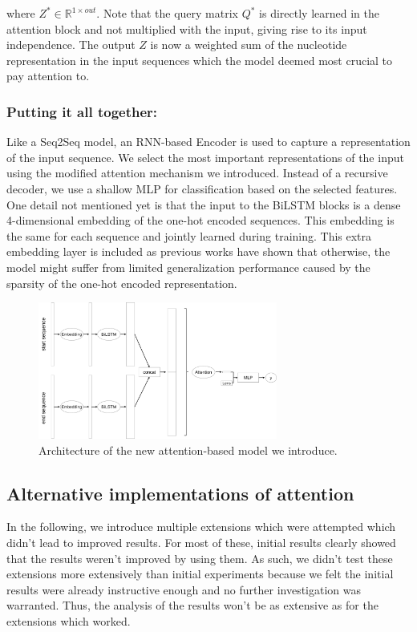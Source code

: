 
where $Z^* \in \mathbb{R}^{1 \times out}$. Note that the query matrix ${Q}^*$ is directly learned in the attention block and not multiplied with the input, giving rise to its input independence. The output $Z$ is now a weighted sum of the nucleotide representation in the input sequences which the model deemed most crucial to pay attention to.
\subsubsection{Putting it all together:} 
Like a Seq2Seq model, an RNN-based Encoder is used to capture a representation of the input sequence. We select the most important representations of the input using the modified attention mechanism we introduced. Instead of a recursive decoder, we use a shallow MLP for classification based on the selected features.
One detail not mentioned yet is that the input to the BiLSTM blocks is a dense 4-dimensional embedding of the one-hot encoded sequences. This embedding is the same for each sequence and jointly learned during training. This extra embedding layer is included as previous works \cite{embeddingneeded} have shown that otherwise, the model might suffer from limited generalization performance caused by the sparsity of the one-hot encoded representation. 

\begin{figure}
	\centering\includegraphics[width=0.7\textwidth]{figures/AttnBiLSTM.pdf} 
	\caption{Architecture of the new attention-based model we introduce. }
	\label{fig:attnbilstm}
\end{figure}

\subsection{Alternative implementations of attention} \label{subsec:alternative_attention}
In the following, we introduce multiple extensions which were attempted which didn't lead to improved results. For most of these, initial results clearly showed that the results weren't improved by using them. As such, we didn't test these extensions more extensively than initial experiments because we felt the initial results were already instructive enough and no further investigation was warranted. Thus, the analysis of the results won't be as extensive as for the extensions which worked.
